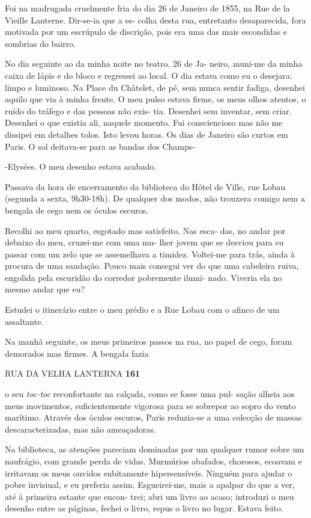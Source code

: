 Foi na madrugada cruelmente fria do dia 26 de Janeiro de 1855, na Rue de
la Vieille Lanterne. Dir-se-ia que a es- colha desta rua, entretanto
desaparecida, fora motivada por um escrúpulo de discrição, pois era uma
das mais escondidas e sombrias do bairro.

No dia seguinte ao da minha noite no teatro, 26 de Ja- neiro, muni-me da
minha caixa de lápis e do bloco e regressei ao local. O dia estava como
eu o desejara: limpo e luminoso. Na Place du Châtelet, de pé, sem nunca
sentir fadiga, desenhei aquilo que via à minha frente. O meu pulso
estava firme, os meus olhos atentos, o ruído do tráfego e das pessoas
não exis- tia. Desenhei sem inventar, sem criar. Desenhei o que existia
ali, naquele momento. Fui consciencioso mas não me dissipei em detalhes
tolos. Isto levou horas. Os dias de Janeiro são curtos em Paris. O sol
deitava-se para as bandas dos Champs-

-Elysées. O meu desenho estava acabado.

Passava da hora de encerramento da biblioteca do Hôtel de Ville, rue
Lobau (segunda a sexta, 9h30-18h). De qualquer dos modos, não trouxera
comigo nem a bengala de cego nem os óculos escuros.

Recolhi ao meu quarto, esgotado mas satisfeito. Nas esca- das, no andar
por debaixo do meu, cruzei-me com uma mu- lher jovem que se desviou para
eu passar com um zelo que se assemelhava a timidez. Voltei-me para trás,
ainda à procura de uma saudação. Pouco mais consegui ver do que uma
cabeleira ruiva, engolida pela escuridão do corredor pobremente ilumi-
nado. Viveria ela no mesmo andar que eu?

Estudei o itinerário entre o meu prédio e a Rue Lobau com o afinco de um
assaltante.

Na manhã seguinte, os meus primeiros passos na rua, no papel de cego,
foram demorados mas firmes. A bengala fazia

RUA DA VELHA LANTERNA \textbf{161}

o seu \emph{toc-toc }reconfortante na calçada, como se fosse uma pul-
sação alheia aos meus movimentos, suficientemente vigorosa para se
sobrepor ao sopro do vento marítimo. Através dos óculos escuros, Paris
reduzia-se a uma colecção de massas descaracterizadas, mas não
ameaçadoras.

Na biblioteca, as atenções pareciam dominadas por um qualquer rumor
sobre um naufrágio, com grande perda de vidas. Murmúrios abafados,
chorosos, ecoavam e irritavam os meus ouvidos subitamente
hipersensíveis. Ninguém para ajudar o pobre invisiual, e eu preferia
assim. Esgueirei-me, mais a apalpar do que a ver, até à primeira estante
que encon- trei; abri um livro ao acaso; introduzi o meu desenho entre
as páginas, fechei o livro, repus o livro no lugar. Estava feito.

